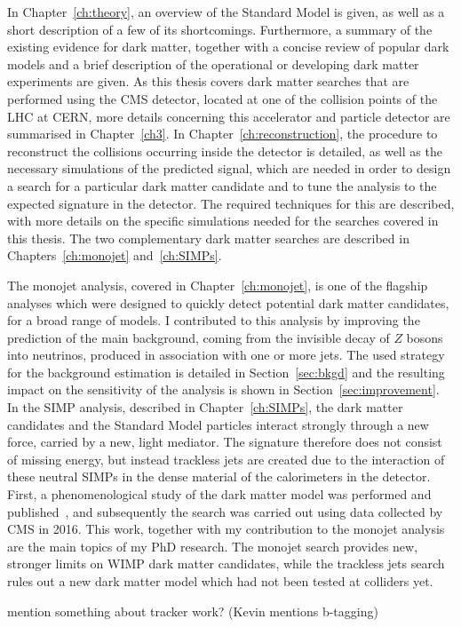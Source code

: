 In Chapter~\ref{ch:theory}, an overview of the Standard Model is given, as well as a short description of a few of its shortcomings. Furthermore, a summary of the existing evidence for dark matter, together with a concise review of popular dark models and a brief description of the operational or developing dark matter experiments are given. As this thesis covers dark matter searches that are performed using the \acs{CMS} detector, located at one of the collision points of the \acs{LHC} at \acs{CERN}, more details concerning this accelerator and particle detector are summarised in Chapter~\ref{ch3}. In Chapter~\ref{ch:reconstruction}, the procedure to reconstruct the collisions occurring inside the detector is detailed, as well as the necessary simulations of the predicted signal, which are needed in order to design a search for a particular dark matter candidate and to tune the analysis to the expected signature in the detector. The required techniques for this are described, with more details on the specific simulations needed for the searches covered in this thesis. The two complementary dark matter searches are described in Chapters~\ref{ch:monojet} and~\ref{ch:SIMPs}.

The monojet analysis, covered in Chapter~\ref{ch:monojet}, is one of the flagship analyses which were designed to quickly detect potential dark matter candidates, for a broad range of models. I contributed to this analysis by improving the prediction of the main background, coming from the invisible decay of $Z$ bosons into neutrinos, produced in association with one or more jets. The used strategy for the background estimation is detailed in Section~\ref{sec:bkgd} and the resulting impact on the sensitivity of the analysis is shown in Section~\ref{sec:improvement}. In the \ac{SIMP} analysis, described in Chapter~\ref{ch:SIMPs}, the dark matter candidates and the Standard Model particles interact strongly through a new force, carried by a new, light mediator. The signature therefore does not consist of missing energy, but instead trackless jets are created due to the interaction of these neutral \acsp{SIMP} in the dense material of the calorimeters in the detector. First, a phenomenological study of the dark matter model was performed and published~\cite{Daci:2015hca}, and subsequently the search was carried out using data collected by \acs{CMS} in 2016. This work, together with my contribution to the monojet analysis are the main topics of my PhD research. The monojet search provides new, stronger limits on \acs{WIMP} dark matter candidates, while the trackless jets search rules out a new dark matter model which had not been tested at colliders yet.

{\color{red} mention something about tracker work? (Kevin mentions b-tagging)}


\clearpage{\pagestyle{empty}\cleardoublepage}
